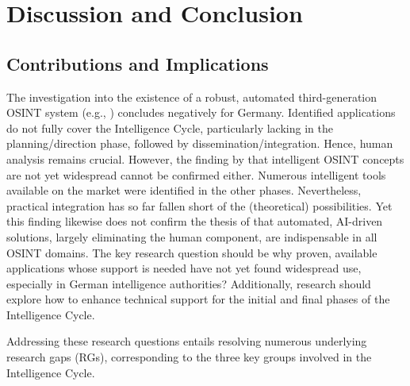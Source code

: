 \documentclass[10pt]{article}
\begin{document}
\section{Discussion and Conclusion} \label{sec:discussion}
\subsection{Contributions and Implications}

The investigation into the existence of a robust, automated third-generation OSINT system (e.g., \cite{Ghioni.2023}) concludes negatively for Germany. Identified applications do not fully cover the Intelligence Cycle, particularly lacking in the planning/direction phase, followed by dissemination/integration. Hence, human analysis remains crucial. However, the finding by \cite{PastorGalindo.2020} that intelligent OSINT
concepts are not yet widespread cannot be confirmed either. Numerous intelligent tools available
on the market were identified in the other phases. Nevertheless, practical integration has so far
fallen short of the (theoretical) possibilities. Yet this finding likewise does not confirm the
thesis of \cite{Yogish.2021} that automated, AI-driven solutions, largely eliminating
the human component, are indispensable in all OSINT domains. The key research
question should be why proven, available applications whose support is needed have not
yet found widespread use, especially in German intelligence authorities? Additionally, research should explore how to enhance technical support for the initial and final phases of the Intelligence Cycle.

Addressing these research questions entails resolving numerous underlying research gaps (RGs), corresponding to the three key groups involved in the Intelligence Cycle.
\end{document}
